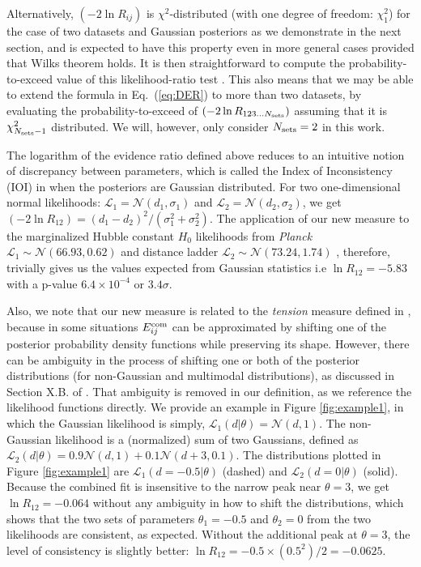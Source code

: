 \documentclass[amsmath, amssymb, reprint, aps]{revtex4-1}
\begin{document}
    {Alternatively, $(-2\ln R_{ij})$ is $\chi^2$-distributed (with one degree of freedom: $\chi^2_1$) for the case of two datasets and Gaussian posteriors as we demonstrate  in the next section, and is expected to have this property even in more general cases provided that Wilks theorem \cite{Wilks} holds. It is then straightforward to compute the probability-to-exceed value of this likelihood-ratio test \cite{kassr95}. This also means that we may be able to extend the formula in Eq.~(\ref{eq:DER}) to more than two datasets, by evaluating the probability-to-exceed of $(-2\ln R_{123...N_{\rm sets}})$ assuming that it is $\chi^2_{N_{\rm sets}-1}$ distributed. We will, however, only consider $N_{\rm sets}=2$ in this work.
        
        The logarithm of the evidence ratio defined above reduces to an intuitive notion of discrepancy between parameters, which is called the Index of Inconsistency (IOI) in \cite{Lin:2017ikq} when the posteriors are Gaussian distributed. For two one-dimensional normal likelihoods: $\mathcal{L}_1 = \mathcal{N}(d_1, \sigma_1)$ and $\mathcal{L}_2 = \mathcal{N}(d_2, \sigma_2)$, we get $(-2\ln R_{12})=(d_1-d_2)^2/(\sigma_1^2+\sigma_2^2)$. The application of our new measure to the marginalized Hubble constant $H_0$ likelihoods from {\it Planck} $\mathcal{L}_1 \sim \mathcal{N}(66.93, 0.62)$ \cite{Ade:2015xua} and distance ladder $\mathcal{L}_2 \sim \mathcal{N}(73.24, 1.74)$ \cite{Riess:2016jrr}, therefore, trivially gives us the values expected from Gaussian statistics i.e $\ln R_{12} = -5.83$ \cite{Lin:2017bhs} with a p-value $6.4\times 10^{-4}$ or $3.4\sigma$.
        
        Also, we note that our new measure is related to the \textit{tension} measure defined in \cite{Verde:2013wza}, because in some situations $E_{ij}^{\rm com}$ can be approximated by shifting one of the posterior probability density functions while preserving its shape. However, there can be ambiguity in the process of shifting one or both of the posterior distributions (for non-Gaussian and multimodal distributions), as discussed in Section X.B. of \cite{Lin:2017ikq}. That ambiguity is removed in our definition, as we reference the likelihood functions directly. We provide an example in Figure \ref{fig:example1}, in which the Gaussian likelihood is simply, $\mathcal{L}_1(d|\theta) = \mathcal{N}(d, 1)$. The non-Gaussian likelihood is a (normalized) sum of two Gaussians, defined as $\mathcal{L}_2(d|\theta) = 0.9 \mathcal{N}(d, 1) + 0.1 \mathcal{N}(d+3, 0.1)$. The distributions plotted in Figure \ref{fig:example1} are $\mathcal{L}_1(d=-0.5|\theta)$ (dashed) and $\mathcal{L}_2(d=0|\theta)$ (solid). Because the combined fit is insensitive to the narrow peak near $\theta=3$, we get $\ln R_{12}=-0.064$ without any ambiguity in how to shift the distributions, which shows that the two sets of parameters $\theta_1=-0.5$ and $\theta_2=0$ from the two likelihoods are consistent, as expected. Without the additional peak at $\theta=3$, the level of consistency is slightly better: $\ln R_{12} = -0.5\times(0.5^2)/2 = -0.0625$.
        
}
\end{document}
